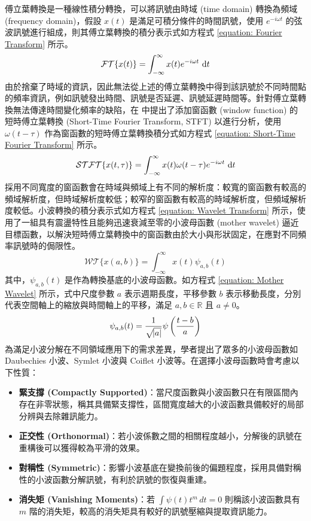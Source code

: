 傅立葉轉換是一種線性積分轉換，可以將訊號由時域 (time domain) 轉換為頻域 (frequency domain)，假設 $x(t)$ 是滿足可積分條件的時間訊號，使用 $e^{-i \omega t}$ 的弦波訊號進行組成，則其傅立葉轉換的積分表示式如方程式 \eqref{equation: Fourier Transform} 所示。
\begin{equation}\label{equation: Fourier Transform}
  \mathcal{FT}\{ x(t) \} = \int_{-\infty}^{\infty} x(t) e^{-i \omega t} \, \mathop{}\!\mathrm{d} t
\end{equation}
%
由於捨棄了時域的資訊，因此無法從上述的傅立葉轉換中得到該訊號於不同時間點的頻率資訊，例如訊號發出時間、訊號是否延遲、訊號延遲時間等。針對傅立葉轉換無法傳達時間變化頻率的缺陷，在 \cite{mallat1989theory} 中提出了添加窗函數 (window function) 的短時傅立葉轉換 (Short-Time Fourier Transform, STFT) 以進行分析，使用 $\omega(t - \tau)$ 作為窗函數的短時傅立葉轉換積分式如方程式 \eqref{equation: Short-Time Fourier Transform} 所示。
\begin{equation}\label{equation: Short-Time Fourier Transform}
  \mathcal{STFT}\{ x(t, \tau) \} = \int_{-\infty}^{\infty} x(t) \omega(t - \tau) e^{-i \omega t} \, \mathop{}\!\mathrm{d} t
\end{equation}
%
採用不同寬度的窗函數會在時域與頻域上有不同的解析度：較寬的窗函數有較高的頻域解析度，但時域解析度較低；較窄的窗函數有較高的時域解析度，但頻域解析度較低。小波轉換的積分表示式如方程式 \eqref{equation: Wavelet Transform} 所示，使用了一組具有震盪特性且能夠迅速衰減至零的小波母函數 (mother wavelet) 逼近目標函數，以解決短時傅立葉轉換中的窗函數由於大小與形狀固定，在應對不同頻率訊號時的侷限性。
\begin{equation}\label{equation: Wavelet Transform}
  \mathcal{WT}\{ x(a, b) \} = \int_{-\infty}^{\infty} x(t) \psi_{a, b}(t)
\end{equation}
%
其中，$\psi_{a,b} (t)$ 是作為轉換基底的小波母函數。如方程式 \eqref{equation: Mother Wavelet} 所示，式中尺度參數 $a$ 表示週期長度，平移參數 $b$ 表示移動長度，分別代表空間軸上的縮放與時間軸上的平移，滿足 $a, b \in \mathbb{R}$ 且 $a \neq 0$。
\begin{equation}\label{equation: Mother Wavelet}
  \psi_{a, b}(t) = \frac{1}{\sqrt{\abs{a}}} \psi \left( \frac{t-b}{a} \right)
\end{equation}
%
為滿足小波分解在不同領域應用下的需求差異，學者提出了眾多的小波母函數如 Daubechies 小波、Symlet 小波與 Coiflet 小波等。在選擇小波母函數時會考慮以下性質：
%
\begin{itemize}
  \item \textbf{緊支撐 (Compactly Supported)}：當尺度函數與小波函數只在有限區間內存在非零狀態，稱其具備緊支撐性，區間寬度越大的小波函數具備較好的局部分辨與去除雜訊能力。
  \item \textbf{正交性 (Orthonormal)}：若小波係數之間的相關程度越小，分解後的訊號在重構後可以獲得較為平滑的效果。
  \item \textbf{對稱性 (Symmetric)}：影響小波基底在變換前後的偏題程度，採用具備對稱性的小波函數分解訊號，有利於訊號的恢復與重建。
  \item \textbf{消失矩 (Vanishing Moments)}：若 $\displaystyle \int \psi(t) t^m \, dt = 0$ 則稱該小波函數具有 $m$ 階的消失矩，較高的消失矩具有較好的訊號壓縮與提取資訊能力。
\end{itemize}

